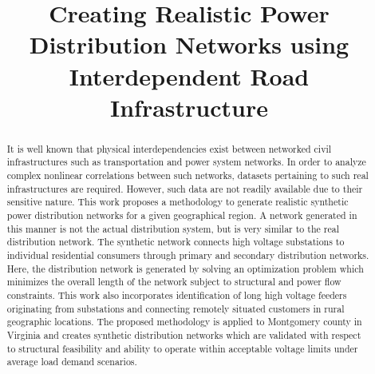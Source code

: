 \documentclass[sigconf]{acmart}
\begin{document}
\title{Creating Realistic Power Distribution Networks using Interdependent Road Infrastructure}





\begin{abstract}
It is well known that physical interdependencies exist between networked civil infrastructures such as transportation and power system networks. In order to analyze complex nonlinear correlations between such networks, datasets pertaining to such real infrastructures are required. However, such data are not readily available due to their sensitive nature. This work proposes a methodology to generate realistic synthetic power distribution networks for a given geographical region. A network generated in this manner is not the actual distribution system, but is very similar to the real distribution network. The synthetic network connects high voltage substations to individual residential consumers through primary and secondary distribution networks. Here, the distribution network is generated by solving an optimization problem which minimizes the overall length of the network subject to structural and power flow constraints. This work also incorporates identification of long high voltage feeders originating from substations and connecting remotely situated customers in rural geographic locations. The proposed methodology is applied to Montgomery county in Virginia and creates synthetic distribution networks which are validated with respect to structural feasibility and ability to operate within acceptable voltage limits under average load demand scenarios.
\end{abstract}
\end{document}
